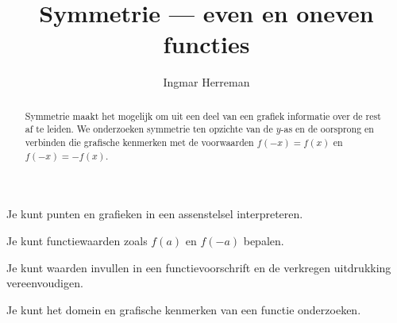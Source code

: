 \documentclass{ximera}
\title{Symmetrie — even en oneven functies}
\author{Ingmar Herreman}
\begin{document}





\begin{abstract}
Symmetrie maakt het mogelijk om uit een deel van een grafiek informatie over
de rest af te leiden. We onderzoeken symmetrie ten opzichte van de \(y\)-as
en de oorsprong en verbinden die grafische kenmerken met de voorwaarden
\(f(-x)=f(x)\) en \(f(-x)=-f(x)\).
\end{abstract}

\maketitle

\begin{voorkennis}

    \item Je kunt punten en grafieken in een assenstelsel interpreteren.
  
    \item Je kunt functiewaarden zoals \(f(a)\) en \(f(-a)\) bepalen.
  
    \item Je kunt waarden invullen in een functievoorschrift en de verkregen uitdrukking vereenvoudigen.
  
    \item Je kunt het domein en grafische kenmerken van een functie onderzoeken.
  
  \end{voorkennis}
  
\end{document}
